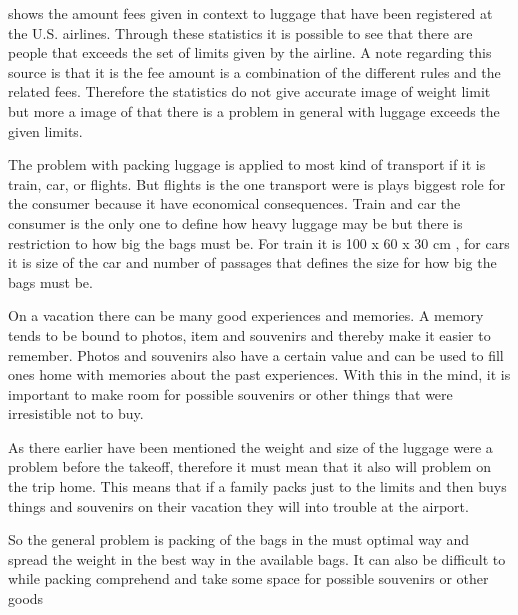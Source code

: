 \citep{airstat} shows the amount fees given in context to luggage that have been registered at the U.S. airlines. Through these statistics it is possible to see that there are people that exceeds the set of limits given by the airline. A note regarding this source is that it is the fee amount is a combination of the different rules and the related fees. Therefore the statistics do not give accurate image of weight limit but more a image of that there is a problem in general with luggage exceeds the given limits.

The problem with packing luggage is applied to most kind of transport if it is train, car, or flights. But flights is the one transport were is plays biggest role for the consumer because it have economical consequences. Train and car the consumer is the only one to define how heavy luggage may be but there is restriction to how big the bags must be. For train it is 100 x 60 x 30 cm \citep{rulestrain}, for cars it is size of the car and number of passages that defines the size for how big the bags must be.

On a vacation there can be many good experiences and memories. A memory tends to be bound to photos, item and souvenirs and thereby make it easier to remember. Photos and souvenirs also have a certain value and can be used to fill ones home with memories about the past experiences.
With this in the mind, it is important to make room for possible souvenirs or other things that were irresistible not to buy.

As there earlier have been mentioned the weight and size of the luggage were a problem before the takeoff, therefore it must mean that it also will problem on the trip home.
This means that if a family packs just to the limits and then buys things and souvenirs on their vacation they will into trouble at the airport.

So the general problem is packing of the bags in the must optimal way and spread the weight in the best way in the available bags. It can also be difficult to while packing comprehend and take some space for possible souvenirs or other goods